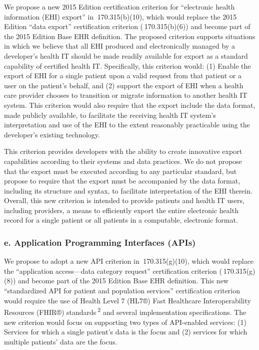 \documentclass[twoside,11pt]{article}
\begin{document}
          We propose a new 2015 Edition certification criterion for “electronic health information (EHI) export” in \textsection{} 170.315(b)(10), which would replace the 2015 Edition “data export” certification criterion (\textsection{} 170.315(b)(6)) and become part of the 2015 Edition Base EHR definition. The proposed criterion supports situations in which we believe that all EHI produced and electronically managed by a developer's health IT should be made readily available for export as a standard capability of certified health IT. Specifically, this criterion would: (1) Enable the export of EHI for a single patient upon a valid request from that patient or a user on the patient's behalf, and (2) support the export of EHI when a health care provider chooses to transition or migrate information to another health IT system. This criterion would also require that the export include the data format, made publicly available, to facilitate the receiving health IT system's interpretation and use of the EHI to the extent reasonably practicable using the developer's existing technology.


          This criterion provides developers with the ability to create innovative export capabilities according to their systems and data practices. We do not propose that the export must be executed according to any particular standard, but propose to require that the export must be accompanied by the data format, including its structure and syntax, to facilitate interpretation of the EHI therein. Overall, this new criterion is intended to provide patients and health IT users, including providers, a means to efficiently export the entire electronic health record for a single patient or all patients in a computable, electronic format.


          \subsubsection{e. Application Programming Interfaces (APIs)}

          We propose to adopt a new API criterion in \textsection{} 170.315(g)(10), which would replace the “application access—data category request” certification criterion (\textsection{} 170.315(g)(8)) and become part of the 2015 Edition Base EHR definition. This new “standardized API for patient and population services” certification criterion would require the use of Health Level 7 (HL7®) Fast Healthcare Interoperability Resources (FHIR®) standards \textsuperscript{2}
             and several implementation specifications. The new criterion would focus on supporting two types of API-enabled services: (1) Services for which a single patient's data is the focus and (2) services for which multiple patients' data are the focus.
\end{document}
